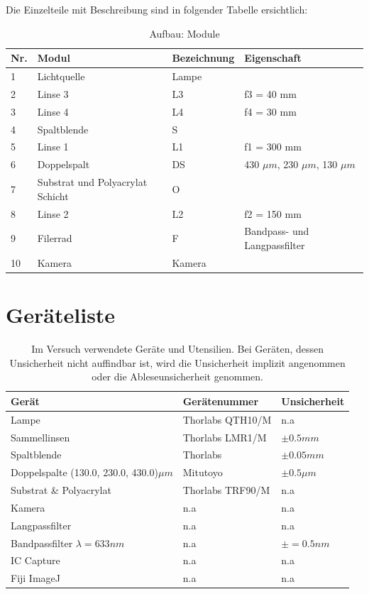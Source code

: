 \documentclass[12pt,a4paper,twoside]{article}
\begin{document}
\noindent
Die Einzelteile mit Beschreibung sind in folgender Tabelle ersichtlich:

\begin{table}[H]
    \centering
    \caption{Aufbau: Module}
    \label{tab:Aufbau}
    \begin{tabular}{| l | l | l | l |}
        \hline
        Nr.  & Modul & Bezeichnung  & Eigenschaft \\
        \hline
        1 & Lichtquelle & Lampe &  \\
        2 & Linse 3 & L3 & f3 = 40 mm \\
        3 & Linse 4 & L4 & f4 = 30 mm \\
        4 & Spaltblende & S &  \\
        5 & Linse 1 & L1 & f1 = 300 mm \\
        6 & Doppelspalt & DS & 430 $\mu m$, 230 $\mu m$, 130 $\mu m$ \\
        7 & Substrat und Polyacrylat Schicht& O &  \\
        8 & Linse 2 & L2 & f2 = 150 mm \\
        9 & Filerrad & F & Bandpass- und Langpassfilter \\
        10& Kamera & Kamera & \\
        \hline
    \end{tabular}
\end{table}

\section{Geräteliste} %

    \begin{table}[H]
        \centering
        \caption{Im Versuch verwendete Geräte und Utensilien. Bei Geräten, dessen Unsicherheit nicht auffindbar ist, wird die Unsicherheit implizit angenommen oder die Ableseunsicherheit genommen. }
        \label{tab:geraete}
        \begin{tabular}{| l | l | l |}
            \hline
            Gerät    & Gerätenummer  & Unsicherheit \\
            \hline
            Lampe & Thorlabs QTH10/M & {n.a} \\
            Sammellinsen & Thorlabs LMR1/M & $\pm 0.5 mm$ \\
            Spaltblende & Thorlabs & $\pm 0.05 mm$ \\
            Doppelspalte (130.0, 230.0, 430.0)$\mu m$ & Mitutoyo & $\pm 0.5 \mu m$ \\
            Substrat \& Polyacrylat & Thorlabs TRF90/M & {n.a} \\
            Kamera & {n.a} & {n.a} \\
            Langpassfilter  & {n.a} & {n.a} \\
            Bandpassfilter $\lambda = 633 nm$& {n.a} & $\pm = 0.5 nm$ \\
            IC Capture & {n.a} & {n.a} \\
            Fiji ImageJ & {n.a} & {n.a} \\
            \hline
        \end{tabular}
    \end{table}
\end{document}

